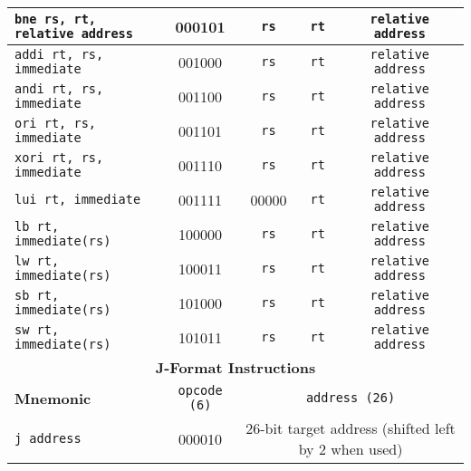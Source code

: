 \documentclass[a4paper, 10pt]{article}
\begin{document}
\begin{table}[ht]
\begin{tabular}{|l|c|c|c|c|c|c|}
        \texttt{bne rs, rt, relative address}   & 000101 & \texttt{rs}   & \texttt{rt}   & \multicolumn{3}{c|}{\texttt{relative address}} \\ \hline
        \texttt{addi rt, rs, immediate}         & 001000 & \texttt{rs}   & \texttt{rt}   & \multicolumn{3}{c|}{\texttt{relative address}}\\ \hline
        \texttt{andi rt, rs, immediate}         & 001100 & \texttt{rs}   & \texttt{rt}   & \multicolumn{3}{c|}{\texttt{relative address}}  \\ \hline
        \texttt{ori rt, rs, immediate}          & 001101 & \texttt{rs}   & \texttt{rt}   & \multicolumn{3}{c|}{\texttt{relative address}}  \\ \hline
        \texttt{xori rt, rs, immediate}         & 001110 & \texttt{rs}   & \texttt{rt}   & \multicolumn{3}{c|}{\texttt{relative address}}  \\ \hline
        \texttt{lui rt, immediate}              & 001111 & 00000         & \texttt{rt}   & \multicolumn{3}{c|}{\texttt{relative address}}  \\ \hline
        \texttt{lb rt, immediate(rs)}           & 100000 & \texttt{rs}   & \texttt{rt}   & \multicolumn{3}{c|}{\texttt{relative address}}  \\ \hline
        \texttt{lw rt, immediate(rs)}           & 100011 & \texttt{rs}   & \texttt{rt}   & \multicolumn{3}{c|}{\texttt{relative address}}  \\ \hline
        \texttt{sb rt, immediate(rs)}           & 101000 & \texttt{rs}   & \texttt{rt}   & \multicolumn{3}{c|}{\texttt{relative address}}  \\ \hline
        \texttt{sw rt, immediate(rs)}           & 101011 & \texttt{rs}   & \texttt{rt}   & \multicolumn{3}{c|}{\texttt{relative address}}  \\ \hline
        \multicolumn{7}{|c|}{\textbf{J-Format Instructions}} \\ \hline
        \textbf{Mnemonic} & \texttt{opcode (6)} & \multicolumn{5}{c|}{\texttt{address (26)}} \\ \hline
        \texttt{j address}   & 000010  & \multicolumn{5}{c|}{26-bit target address (shifted left by 2 when used)} \\ \hline
    \end{tabular}
\end{table}
\end{document}
